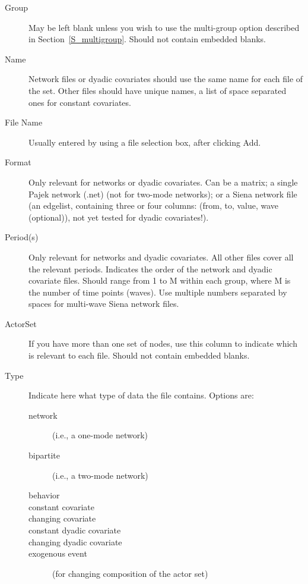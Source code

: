 \documentclass[a4paper,fleqn]{article}
\newcommand{\+}{\, + \,}
\newcommand{\sfn}[1]{\textsf{#1}}
\begin{document}
{\begin{description}
\item[\sfn{Group}] May be left blank unless you wish to use the
  \sfn{multi-group} option described in Section~\ref{S_multigroup}. Should not
  contain embedded blanks.
\item[\sfn{Name}] Network files or dyadic covariates should use the same name
  for each file of the set. Other files should have unique names, a list of
  space separated ones for constant covariates.
\item[\sfn{File Name}] Usually entered by using a file selection box, after
  clicking \sfn{Add}.
\item[\sfn{Format}] Only relevant for networks or dyadic covariates. Can be
  a matrix; a single
  Pajek network (\sfn{.net}) (not for two-mode networks);
  or a \sfn{Siena network file} (an edgelist,
  containing three or four columns: (from, to, value, wave (optional)), not yet
  tested for dyadic covariates!).
\item[\sfn{Period(s)}] Only relevant for networks and dyadic covariates. All
  other files cover all the relevant periods. Indicates the order of the network
  and dyadic covariate files. Should range from 1 to \sfn{M} within each
  \sfn{group}, where \sfn{M} is the number of time points (waves).
  Use multiple numbers separated by spaces for multi-wave Siena
  network files.
\item[\sfn{ActorSet}] If you have more than one set of nodes, use this column to
  indicate which is relevant to each file. Should not contain embedded blanks.
\item[\sfn{Type}] Indicate here what type of data the file contains. Options
  are:
\begin{description}
\item[\sfn{network}] (i.e., a one-mode network)
\item[\sfn{bipartite}] (i.e., a two-mode network)
\item[\sfn{behavior}]
\item[\sfn{constant covariate}]
\item[\sfn{changing covariate}]
\item[\sfn{constant dyadic covariate}]
\item[\sfn{changing dyadic covariate}]
\item[\sfn{exogenous event}] (for changing composition of the actor set)
\end{description}

\end{description}}
\end{document}
